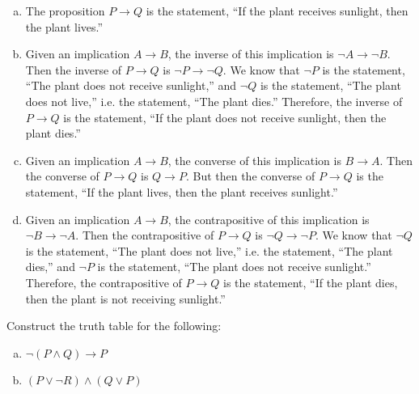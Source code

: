 \documentclass[11pt,letterpaper]{article}
\begin{document}
\sol 
\begin{enumerate}[(a)]
\item The proposition $P \to Q$ is the statement, ``If the plant receives sunlight, then the plant lives.'' \pspace

\item Given an implication $A \to B$, the inverse of this implication is $\neg A \to \neg B$. Then the inverse of $P \to Q$ is $\neg P \to \neg Q$. We know that $\neg P$ is the statement, ``The plant does not receive sunlight,'' and $\neg Q$ is the statement, ``The plant does not live,'' i.e. the statement, ``The plant dies.'' Therefore, the inverse of $P \to Q$ is the statement, ``If the plant does not receive sunlight, then the plant dies.'' \pspace

\item Given an implication $A \to B$, the converse of this implication is $B \to A$. Then the converse of $P \to Q$ is $Q \to P$. But then the converse of $P \to Q$ is the statement, ``If the plant lives, then the plant receives sunlight.'' \pspace

\item Given an implication $A \to B$, the contrapositive of this implication is $\neg B \to \neg A$. Then the contrapositive of $P \to Q$ is $\neg Q \to \neg P$. We know that $\neg Q$ is the  statement, ``The plant does not live,'' i.e. the statement, ``The plant dies,'' and $\neg P$ is the statement, ``The plant does not receive sunlight.'' Therefore, the contrapositive of $P \to Q$ is the statement, ``If the plant dies, then the plant is not receiving sunlight.'' 
\end{enumerate}



\newpage



 Construct the truth table for the following:
	\begin{enumerate}[(a)]
	\item $\neg (P \wedge Q) \to P$
	\item $(P \vee \neg R) \wedge (Q \vee P)$
	\end{enumerate} \pspace
\end{document}
